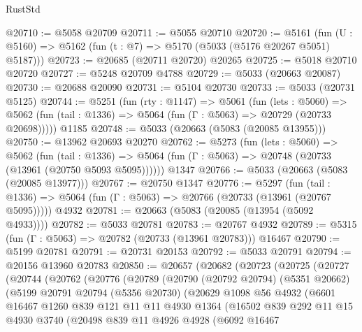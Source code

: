 \begin{lexlean}{RustStd}
\begin{coremodule}
@20710 := @5058 @20709
@20711 := @5055 @20710
@20720 := @5161
    (fun (U : @5160) => @5162 (fun (t : @7) => @5170 (@5033 (@5176 @20267 @5051) @5187)))
@20723 := @20685 (@20711 @20720) @20265
@20725 := @5018 @20710 @20720
@20727 := @5248 @20709 @4788
@20729 := @5033 (@20663 @20087)
@20730 := @20688 @20090
@20731 := @5104 @20730
@20733 := @5033 (@20731 @5125)
@20744 := @5251
    (fun (rty : @1147) =>
    @5061
      (fun (lets : @5060) =>
      @5062 (fun (tail : @1336) => @5064 (fun (Γ : @5063) => @20729 (@20733 @20698)))))
    @1185
@20748 := @5033 (@20663 (@5083 (@20085 @13955)))
@20750 := @13962 @20693 @20270
@20762 := @5273
    (fun (lets : @5060) =>
    @5062
      (fun (tail : @1336) =>
      @5064 (fun (Γ : @5063) => @20748 (@20733 (@13961 (@20750 @5093 @5095))))))
    @1347
@20766 := @5033 (@20663 (@5083 (@20085 @13977)))
@20767 := @20750 @1347
@20776 := @5297
    (fun (tail : @1336) => @5064 (fun (Γ : @5063) => @20766 (@20733 (@13961 (@20767 @5095)))))
    @4932
@20781 := @20663 (@5083 (@20085 (@13954 (@5092 @4933))))
@20782 := @5033 @20781
@20783 := @20767 @4932
@20789 := @5315 (fun (Γ : @5063) => @20782 (@20733 (@13961 @20783))) @16467
@20790 := @5199 @20781
@20791 := @20731 @20153
@20792 := @5033 @20791
@20794 := @20156 @13960 @20783
@20850 := @20657
    (@20682
      (@20723
        (@20725
          (@20727
            (@20744
              (@20762
                (@20776
                  (@20789
                    (@20790
                      (@20792 @20794)
                      (@5351 @20662)
                      (@5199
                        @20791
                        @20794
                        (@5356 @20730)
                        (@20629
                          @1098
                          @56
                          @4932
                          (@6601
                            @16467
                            @1260
                            @839
                            @121
                            @11
                            @11
                            @4930
                            @1364
                            (@16502
                              @839
                              @292
                              @11
                              @15
                              @4930
                              @3740
                              (@20498
                                @839
                                @11
                                @4926
                                @4928
                                (@6092
                                  @16467

\end{coremodule}
\end{lexlean}

